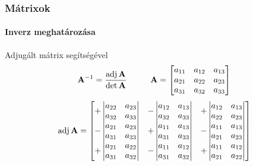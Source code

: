 \begin{frame}
  \frametitle{Mátrixok}
  \framesubtitle{Inverz meghatározása}

  \begin{block}{Adjugált mátrix segítségével}
    \[
      \mathbf{A}^{-1} = \frac{\operatorname{adj} \mathbf{A}}{\det \mathbf{A}}
      \hspace{1cm}
      \mathbf{A} = \begin{bmatrix}
        a_{11} & a_{12} & a_{13} \\
        a_{21} & a_{22} & a_{23} \\
        a_{31} & a_{32} & a_{33}
      \end{bmatrix}
    \]
    \[
      \operatorname{adj} \mathbf{A} = \begin{bmatrix}
        + \begin{vmatrix}
            a_{22} & a_{23} \\
            a_{32} & a_{33}
          \end{vmatrix}
         &
        - \begin{vmatrix}
            a_{12} & a_{13} \\
            a_{32} & a_{33}
          \end{vmatrix}
         &
        +\begin{vmatrix}
           a_{12} & a_{13} \\
           a_{22} & a_{23}
         \end{vmatrix}
        \\
        - \begin{vmatrix}
            a_{21} & a_{23} \\
            a_{31} & a_{33}
          \end{vmatrix}
         &
        + \begin{vmatrix}
            a_{11} & a_{13} \\
            a_{31} & a_{33}
          \end{vmatrix}
         &
        - \begin{vmatrix}
            a_{11} & a_{13} \\
            a_{21} & a_{23}
          \end{vmatrix}
        \\
        + \begin{vmatrix}
            a_{21} & a_{22} \\
            a_{31} & a_{32}
          \end{vmatrix}
         &
        - \begin{vmatrix}
            a_{11} & a_{12} \\
            a_{31} & a_{32}
          \end{vmatrix}
         &
        +\begin{vmatrix}
           a_{11} & a_{12} \\
           a_{21} & a_{22}
         \end{vmatrix}
      \end{bmatrix}
    \]
  \end{block}
\end{frame}

